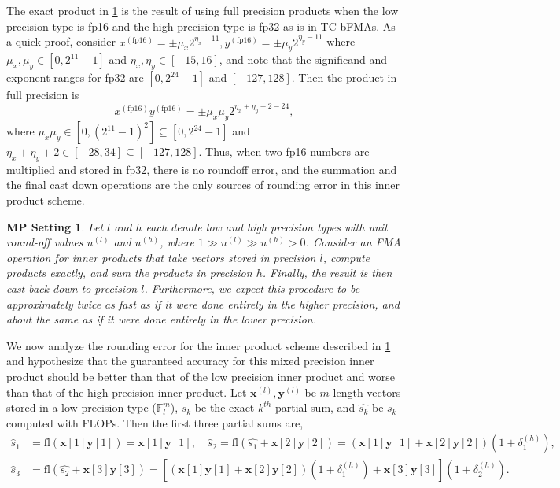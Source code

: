 \documentclass[review,onefignum,onetabnum]{siamart190516}
\newtheorem{assump}[theorem]{MP Setting}
\newcommand{\F}{\mathbb{F}}
\newcommand{\dd}{\delta}
\newcommand{\bb}[1]{\mathbf{#1}}
\newcommand{\fl}{\mathrm{fl}}
\begin{document}
The exact product in \cref{assump:mp} is the result of using full precision products when the low precision type is fp16 and the high precision type is fp32 as is in TC bFMAs.
As a quick proof, consider $x^{(\text{fp16})} = \pm\mu_x2^{\eta_x -11},y^{(\text{fp16})} = \pm\mu_y2^{\eta_y -11}$ where $\mu_x,\mu_y\in[0,2^{11}-1]$ and $\eta_x,\eta_y\in[-15,16]$, and note that the significand and exponent ranges for fp32 are $[0, 2^{24}-1]$ and $[-127,128]$.
Then the product in full precision is
\[x^{(\text{fp16})}y^{(\text{fp16})} = \pm\mu_x\mu_y 2^{\eta_x+\eta_y+2-24},\]
where  $\mu_x\mu_y \in[0,(2^{11}-1)^2] \subseteq [0,2^{24}-1]$ and $\eta_x+\eta_y +2\in[-28,34]\subseteq[-127,128]$.
Thus, when two fp16 numbers are multiplied and stored in fp32, there is no roundoff error, and the summation and the final cast down operations are the only sources of rounding error in this inner product scheme.
\begin{assump}
	\label{assump:mp}
	Let $l$ and $h$ each denote low and high precision types with unit round-off values $u^{(l)}$ and $u^{(h)}$, where $1 \gg u^{(l)} \gg u^{(h)} >0$.
	Consider an FMA operation for inner products that take vectors stored in precision $l$, compute products exactly, and sum the products in precision $h$. 
	Finally, the result is then cast back down to precision $l$.
	Furthermore, we expect this procedure to be approximately twice as fast as if it were done entirely in the higher precision, and about the same as if it were done entirely in the lower precision. 
\end{assump}
We now analyze the rounding error for the inner product scheme described in \cref{assump:mp} and hypothesize that the guaranteed accuracy for this mixed precision inner product should be better than that of the low precision inner product and worse than that of the high precision inner product.
Let $\bb{x}^{(l)},\bb{y}^{(l)}$ be $m$-length vectors stored in a low precision type ($\F_l^m$), $s_k$ be the exact $k^{th}$ partial sum, and $\hat{s_k}$ be $s_k$ computed with FLOPs.
Then the first three partial sums are,
\begin{align*}
\hat{s}_1 &= \fl (\bb{x}[1]\bb{y}[1]) = \bb{x}[1]\bb{y}[1],\quad \hat{s}_2 = \fl(\hat{s_1} + \bb{x}[2]\bb{y}[2]) = \left(\bb{x}[1]\bb{y}[1]+ \bb{x}[2]\bb{y}[2]\right)(1+\dd_{1}^{(h)}),\\
\hat{s}_3 &= \fl(\hat{s_2}+\bb{x}[3]\bb{y}[3]) = \left[\left(\bb{x}[1]\bb{y}[1] + \bb{x}[2]\bb{y}[2]\right)(1+\dd_{1}^{(h)})  + \bb{x}[3]\bb{y}[3]\right](1+\dd_{2}^{(h)}).
\end{align*}
\end{document}
